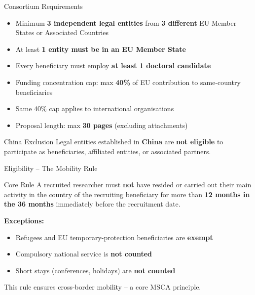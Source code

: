 \documentclass[aspectratio=169]{beamer}
\newcommand{\highlight}[1]{\textcolor{euBlue}{\textbf{#1}}}
\begin{document}
\begin{frame}{Consortium Requirements}
\begin{itemize}
  \item Minimum \highlight{3 independent legal entities} from \highlight{3 different} EU Member States or Associated Countries
  \item At least \textbf{1 entity must be in an EU Member State}
  \item Every beneficiary must employ \textbf{at least 1 doctoral candidate}
  \item Funding concentration cap: max \textbf{40\%} of EU contribution to same-country beneficiaries
  \item Same 40\% cap applies to international organisations
  \item Proposal length: max \textbf{30 pages} (excluding attachments)
\end{itemize}
\vspace{6pt}
\begin{alertblock}{China Exclusion}
Legal entities established in \textbf{China} are \textbf{not eligible} to participate as beneficiaries, affiliated entities, or associated partners.
\end{alertblock}
\end{frame}

\begin{frame}{Eligibility -- The Mobility Rule}
\begin{block}{Core Rule}
A recruited researcher must \textbf{not} have resided or carried out their main activity in the country of the recruiting beneficiary for more than \highlight{12 months in the 36 months} immediately before the recruitment date.
\end{block}
\vspace{8pt}
\textbf{Exceptions:}
\begin{itemize}
  \item Refugees and EU temporary-protection beneficiaries are \textbf{exempt}
  \item Compulsory national service is \textbf{not counted}
  \item Short stays (conferences, holidays) are \textbf{not counted}
\end{itemize}
\vspace{6pt}
\textcolor{euBlue}{\small This rule ensures cross-border mobility -- a core MSCA principle.}
\end{frame}
\end{document}

